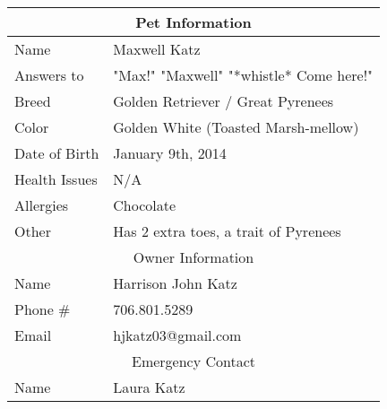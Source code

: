 \documentclass[pdftex,12pt]{article}
\begin{document}
\begin{table}[H]
    \begin{longtable}{@{}ll@{}}
        \toprule
        \multicolumn{2}{c}{Pet Information}                                                                              \\ \midrule
        Name          & Maxwell Katz                                                                                     \\
        Answers to    & "Max!" "Maxwell" "*whistle* Come here!"                                                          \\
        Breed         & Golden Retriever / Great Pyrenees                                                                \\
        Color         & Golden White (Toasted Marsh-mellow)                                                              \\
        Date of Birth & January 9th, 2014                                                                                \\
        Health Issues & N/A                                                                                              \\
        Allergies     & Chocolate                                                                                        \\
        Other         & Has 2 extra toes, a trait of Pyrenees                                                            \\ \midrule
        \multicolumn{2}{c}{Owner Information}                                                                            \\ \midrule
        Name          & Harrison John Katz                                                                               \\
        Phone \#      & 706.801.5289                                                                                     \\
        Email         & hjkatz03@gmail.com                                                                               \\ \midrule
        \multicolumn{2}{c}{Emergency Contact}                                                                            \\ \midrule
        Name          & Laura Katz                                                                                       \\

\end{longtable}
\end{table}
\end{document}
